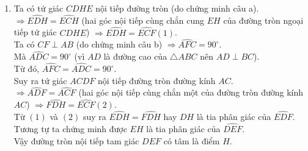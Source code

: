 \begin{ex}
{\begin{enumerate}
		$\Rightarrow CF \perp AB \Rightarrow \widehat{BFC}=90^\circ$.\\
		Mà $\widehat{BEC}=90^\circ$ (vì $BE$ là đường cao của $\triangle ABC$).\\
		Vậy $\widehat{BFC} = \widehat{BEC} =90^\circ$.\\
		Do đó, tứ giác $BCEF$ nội tiếp đường tròn đường kính $BC$.\\
		Vậy $\widehat{EBF}=\widehat{ECF}$ (hai góc nội tiếp cùng chắn cung $\widehat{FE} \overset\frown{AB}$ của đường tròn đường kính $BC$).
		\item Ta có tứ giác $CDHE$ nội tiếp đường tròn (do chứng minh câu a).\\
		$\Rightarrow \widehat{EDH} = \widehat{ECH}$ (hai góc nội tiếp cùng chắn cung $EH$ của đường tròn ngoại tiếp tứ giác $CDHE$) $\Rightarrow \widehat{EDH} = \widehat{ECF} (1)$. \\
		Ta có $CF \perp AB$ (do chứng minh câu b) $\Rightarrow \widehat{AFC} = 90^\circ$.\\
		Mà $ \widehat{ADC} =90^\circ$ (vì $AD$ là đường cao của $\triangle ABC$ nên $AD \perp BC$).\\
		Từ đó, $ \widehat{AFC} = \widehat{ADC} =90^\circ$.\\
		Suy ra tứ giác $ACDF$ nội tiếp đường tròn đường kính $AC$.\\
		$\Rightarrow \widehat{ADF} = \widehat{ACF}$ (hai góc nội tiếp cùng chắn một của đường tròn đường kính $AC$) $\Rightarrow \widehat{FDH} = \widehat{ECF} (2)$.\\
		Từ $(1)$ và $(2)$ suy ra $ \widehat{EDH} =\widehat{FDH}$ hay $DH$ là tia phân giác của $\widehat{EDF}$.\\
		Tương tự ta chứng minh được $EH$ là tia phân giác của $\widehat{DEF}$.\\
		Vậy đường tròn nội tiếp tam giác $DEF$ có tâm là điểm $H$.
	\end{enumerate}
}

\end{ex}
